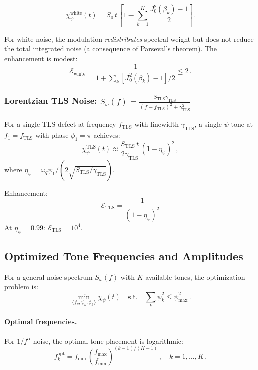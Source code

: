 \documentclass[aps,prl,twocolumn,superscriptaddress,nofootinbib,longbibliography]{revtex4-2}
\begin{document}
\begin{equation}
\chi_\psi^{\text{white}}(t) = S_0\,t\,
\left[1 - \sum_{k=1}^K \frac{J_0^2(\beta_k) - 1}{2}\right].
\end{equation}

For white noise, the modulation \emph{redistributes} spectral weight
but does not reduce the total integrated noise (a consequence of
Parseval's theorem). The enhancement is modest:
\begin{equation}
\mathcal{E}_{\text{white}} = \frac{1}{1 + \sum_k[J_0^2(\beta_k)-1]/2}
\leq 2\,.
\end{equation}

\subsubsection{Lorentzian TLS Noise:
$S_\omega(f) = \frac{S_{\text{TLS}}\gamma_{\text{TLS}}}
{(f - f_{\text{TLS}})^2 + \gamma_{\text{TLS}}^2}$}

For a single TLS defect at frequency $f_{\text{TLS}}$ with linewidth
$\gamma_{\text{TLS}}$, a single $\psi$-tone at $f_1 = f_{\text{TLS}}$
with phase $\phi_1 = \pi$ achieves:
\begin{equation}\label{eq:chi-TLS}
\chi_\psi^{\text{TLS}}(t) \approx
\frac{S_{\text{TLS}}\,t}{2\gamma_{\text{TLS}}}\,
(1 - \eta_\psi)^2\,,
\end{equation}
where $\eta_\psi = \omega_q\psi_1/(2\sqrt{S_{\text{TLS}}/\gamma_{\text{TLS}}})$.

Enhancement:
\begin{equation}\label{eq:enhance-TLS}
\boxed{
\mathcal{E}_{\text{TLS}} = \frac{1}{(1 - \eta_\psi)^2}
}
\end{equation}
At $\eta_\psi = 0.99$: $\mathcal{E}_{\text{TLS}} = 10^4$.

\subsection{Optimized Tone Frequencies and Amplitudes}

For a general noise spectrum $S_\omega(f)$ with $K$ available tones,
the optimization problem is:
\begin{equation}
\min_{\{f_k, \psi_k, \phi_k\}} \chi_\psi(t)
\quad \text{s.t.} \quad \sum_k \psi_k^2 \leq \psi_{\text{max}}^2\,.
\end{equation}

\paragraph{Optimal frequencies.} For $1/f^\alpha$ noise, the optimal
tone placement is logarithmic:
\begin{equation}\label{eq:f-opt}
f_k^{\text{opt}} = f_{\text{min}}\,\left(\frac{f_{\text{max}}}
{f_{\text{min}}}\right)^{(k-1)/(K-1)}\,,\quad k = 1,\ldots,K\,.
\end{equation}
\end{document}

